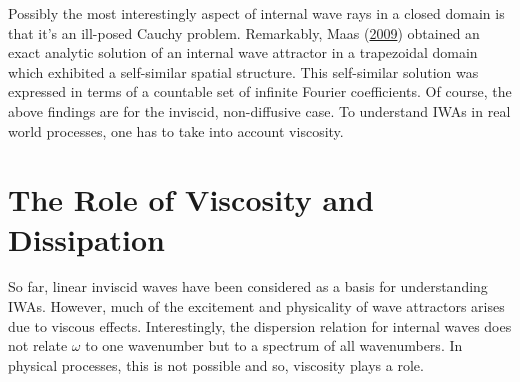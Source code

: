 \documentclass[a4paper]{article}
\numberwithin{equation}{section}
\begin{document}
Possibly the most interestingly aspect of internal wave rays in a closed domain is that it's an ill-posed Cauchy problem. Remarkably, Maas (\hyperlink{ref 20}{2009}) obtained an exact analytic solution of an internal wave attractor in a trapezoidal domain which exhibited a self-similar spatial structure. This self-similar solution was expressed in terms of a countable set of infinite Fourier coefficients. Of course, the above findings are for the inviscid, non-diffusive case. To understand IWAs in real world processes, one has to take into account viscosity. 
\section{The Role of Viscosity and Dissipation}
\label{sec:4}
So far, linear inviscid waves have been considered as a basis for understanding IWAs. However, much of the excitement and physicality of wave attractors arises due to viscous effects. Interestingly, the dispersion relation for internal waves does not relate $\omega$ to one wavenumber but to a spectrum of all wavenumbers. In physical processes, this is not possible and so, viscosity plays a role. 
\end{document}
